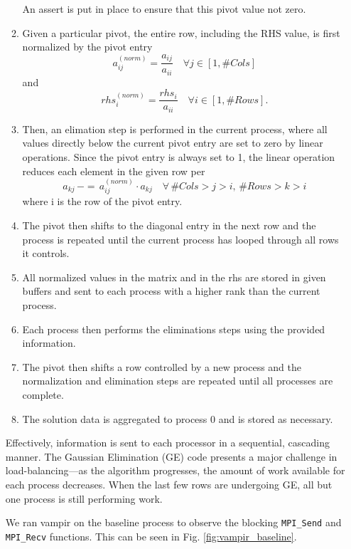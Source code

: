 \begin{enumerate}
\begin{enumerate}
An assert is put in place to ensure that this pivot value not zero. 
\item Given a particular pivot, the entire row, including the RHS value, is first normalized by the pivot entry 
\begin{equation*}
	a_{ij}^{(norm)} = \frac{a_{ij}}{a_{ii}} \quad \forall j \in [1, \# Cols]
\end{equation*}
and 
\begin{equation*}
rhs_{i}^{(norm)} = \frac{rhs_{i}}{a_{ii}} \quad \forall i \in [1, \# Rows].
\end{equation*}

\item Then, an elimation step is performed in the current process, where all values directly below the current pivot entry are set to zero by linear operations. Since the pivot entry is always set to 1, the linear operation reduces each element in the given row per
\begin{equation*}
	a_{kj} \,-=\, a_{ij}^{(norm)} \cdot a_{kj} \quad \forall \,\# Cols > j > i, \,\# Rows > k > i
\end{equation*}
where i is the row of the pivot entry. 
\item The pivot then shifts to the diagonal entry in the next row and the process is repeated until the current process has looped through all rows it controls.
\item All normalized values in the matrix and in the rhs are stored in given buffers and sent to each process with a higher rank than the current process.
\item Each process then performs the eliminations steps using the provided information.
\item The pivot then shifts a row controlled by a new process and the normalization and elimination steps are repeated until all processes are complete.
\item The solution data is aggregated to process 0 and is stored as necessary.
\end{enumerate}

Effectively, information is sent to each processor in a sequential, cascading manner. The Gaussian Elimination (GE) code presents a major challenge in load-balancing---as the algorithm progresses, the amount of work available for each process decreases. When the last few rows are undergoing GE, all but one process is still performing work. 

We ran vampir on the baseline process to observe the blocking \verb!MPI_Send! and \verb!MPI_Recv! functions. This can be seen in Fig. \ref{fig:vampir_baseline}.


\end{enumerate}
